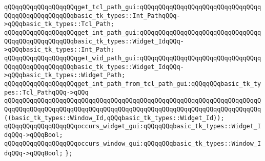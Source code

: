 \newline
\newline
\verb|qQQqqQQqqQQqqQQqqQQqget_tcl_path_gui:qQQqqQQqqQQqqQQqqQQqqQQqqQQqqQQqqQQqqQQqqQQqqQQqqQQqbasic_tk_types::Int_PathqQQq->qQQqbasic_tk_types::Tcl_Path;|\newline
\verb|qQQqqQQqqQQqqQQqqQQqget_int_path_gui:qQQqqQQqqQQqqQQqqQQqqQQqqQQqqQQqqQQqqQQqqQQqqQQqqQQqbasic_tk_types::Widget_IdqQQq->qQQqbasic_tk_types::Int_Path;|\newline
\verb|qQQqqQQqqQQqqQQqqQQqget_wid_path_gui:qQQqqQQqqQQqqQQqqQQqqQQqqQQqqQQqqQQqqQQqqQQqqQQqqQQqbasic_tk_types::Widget_IdqQQq->qQQqbasic_tk_types::Widget_Path;|\newline
\verb|qQQqqQQqqQQqqQQqqQQqget_int_path_from_tcl_path_gui:qQQqqQQqbasic_tk_types::Tcl_PathqQQq->qQQq|\newline
\verb|qQQqqQQqqQQqqQQqqQQqqQQqqQQqqQQqqQQqqQQqqQQqqQQqqQQqqQQqqQQqqQQqqQQqqQQqqQQqqQQqqQQqqQQqqQQqqQQqqQQqqQQqqQQqqQQqqQQqqQQqqQQqqQQqqQQqqQQqqQQq((basic_tk_types::Window_Id,qQQqbasic_tk_types::Widget_Id));|\newline
\newline
\verb|qQQqqQQqqQQqqQQqqQQqoccurs_widget_gui:qQQqqQQqbasic_tk_types::Widget_IdqQQq->qQQqBool;|\newline
\verb|qQQqqQQqqQQqqQQqqQQqoccurs_window_gui:qQQqqQQqbasic_tk_types::Window_IdqQQq->qQQqBool;|\newline
\newline
\verb|};|\newline

